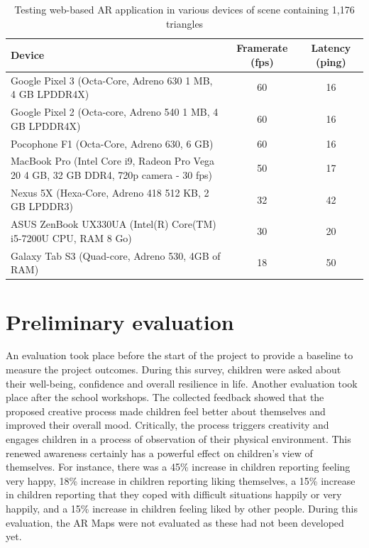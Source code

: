 \documentclass[acmlarge,screen,dvipsnames]{acmart}
\begin{document}

\begin{table}[h] \centering 
\begin{tabular}{|>{\arraybackslash}p{10cm}|c|c|} 
\hline 
Device & Framerate (fps) & Latency (ping)\\  
\hline \hline 
Google Pixel 3 (Octa-Core, Adreno 630 1 MB, 4 GB LPDDR4X) &  60 & 16\\ 
\hline
 Google Pixel 2 (Octa-core,
Adreno 540 1 MB, 4 GB LPDDR4X)  &  60 & 16\\ 
\hline
Pocophone F1 (Octa-Core, Adreno 630, 6 GB) & 60 & 16 \\ 
\hline 
MacBook Pro
(Intel Core i9, Radeon Pro Vega 20 4 GB, 32 GB DDR4, 720p camera - 30 fps)  &
50 & 17\\ 

\hline  
Nexus 5X (Hexa-Core, Adreno 418 512 KB, 2 GB LPDDR3) & 32 & 42
\\ 
\hline 
ASUS ZenBook UX330UA (Intel(R) Core(TM) i5-7200U CPU, RAM 8 Go) & 30
& 20\\ 
\hline 
Galaxy Tab S3 (Quad-core, Adreno 530, 4GB of RAM) & 18 & 50\\
\hline 
\end{tabular} 
 \caption{Testing web-based AR application in various
devices of scene containing 1,176 triangles} \label{table:framerates} 
\end{table}




\section{Preliminary evaluation} \label{eval} 
\color{blue}
An evaluation took place before
the start of the project to provide a baseline to measure the
project outcomes. During this survey, children were asked about their
well-being, confidence and overall resilience in life. Another evaluation took
place after the school workshops. The collected feedback showed that the proposed creative process made children feel better about themselves and improved their overall mood. Critically, the process triggers creativity and engages children in a process of observation of their physical environment. This renewed awareness certainly has a powerful effect on children's view of themselves.
For
instance, there was a 45\% increase in children reporting feeling very happy,
18\% increase in children reporting liking themselves, a 15\% increase in
children reporting that they coped with difficult situations happily or very
happily, and a 15\% increase in children feeling liked by other people. During
this evaluation, the AR Maps were not evaluated as these had not been developed yet.
\color{black}
\end{document}
